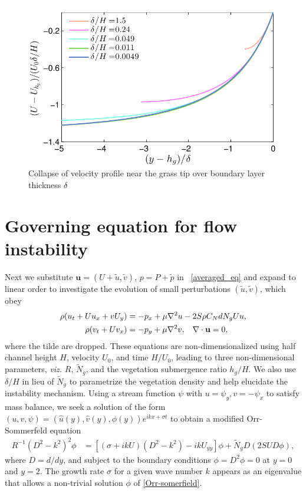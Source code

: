 \documentclass[12pt]{report}   %
\newcommand{\bu}{\mathbf{u}}
\newcommand{\hg}{h_g}
\newcommand{\Rey}{{R}}
\newcommand{\Ndg}{\tilde{N}_g}
\begin{document}
\begin{figure}
\centerline{\includegraphics[]{Grass_shear_scale_collapse} }
\caption{
Collapse of velocity profile near the grass tip over boundary layer thickness $\delta$  
}
\label{base_collapse}
\end{figure}
\section{Governing equation for flow instability}
Next we substitute $\bu = (U+\tilde{u}, \tilde{v})$, $p=P+\tilde{p}$ in ~\eqref{averaged_eq} and expand to linear order to investigate the evolution of small perturbations $(\tilde{u}, \tilde{v})$, which obey
\begin{equation}
\begin{split}
\rho(u_t+U u_x+vU_y) &= -p_x+ {\mu}\nabla^2u-2S\rho C_{N}dN_{g}Uu, \\
\rho(v_t+ Uv_x) &= -p_y+ {\mu}\nabla^2v, \hspace{0.3cm} \nabla\cdot\bu=0,
\label{LinearizedNavierStokes}
\end{split} 
\end{equation}
where the tilde are dropped.
These equations are non-dimensionalized using half channel height $H$, velocity $U_0$, and time $H/U_0$, leading to three non-dimensional parameters, \textit{viz.} $\Rey$, $\Ndg$, and the vegetation submergence ratio $\hg/H$. 
We also use $\delta/H$ in lieu of $\Ndg$ to parametrize the vegetation density and help elucidate the instability mechanism. 
Using a stream function $\psi$ with $u = \psi_{y}, v= -\psi_x$ to satisfy mass balance, we seek a solution of 
the form $\left(u,v,\psi \right)= \left(\hat u(y), \hat v(y), \phi(y) \right)e^{ikx+\sigma t}$ to obtain a modified Orr-Sommerfeld equation \cite{Drazin81,Chen97,Chu91} 
\begin{equation}
\begin{split}
\Rey^{-1}\left(D^2 -k^{2} \right)^2\phi &= \left[ \left({\sigma}+ikU\right) \left(D^2-k^2\right) -ikU_{yy}\right]\phi + \Ndg D\left(2 S U D \phi\right),
\label{Orr-somerfield}
\end{split}
\end{equation}
where $D=d/dy$, and subject to the boundary conditions $\phi = D^2\phi = 0$ at $y=0$ and $y=2$. 
The growth rate $\sigma$ for a given wave number $k$ appears as an eigenvalue that allows a non-trivial solution $\phi$ of  \eqref{Orr-somerfield}.
\end{document}
